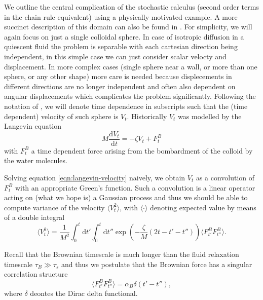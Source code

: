 \documentclass{doctoral}
\newcommand{\dd}{\mathrm{d}}
\begin{document}
We outline the central complication of the stochastic calculus (second order terms in the chain rule equivalent) using a physically motivated example.
A more succinct description of this domain can also be found in \textcite{Waszkiewicz_2023_pychastic}.
For simplicity, we will again focus on just a single colloidal sphere.
In case of isotropic diffusion in a quiescent fluid the problem is separable with each cartesian direction being independent, in this simple case we can just consider scalar velocty and displacement.
In more complex cases (single sphere near a wall, or more than one sphere, or any other shape) more care is needed because displecements in different directions are no longer independent and often also dependent on angular displacements which complicates the problem significantly.
Following the notation of \textcite{Ottinger_2012}, we will denote time dependence in subscripts such that the (time dependent) velocity of such sphere is $V_t$.
Historically $V_t$ was modelled by the Langevin equation
\begin{equation}
    M \frac{\dd V_t}{\dd t} = - \zeta V_t + F^{B}_t \label{eqn:langevin-velocity}
\end{equation}
with $F^B_t$ a time dependent force arising from the bombardment of the colloid by the water molecules.

Solving equation \eqref{eqn:langevin-velocity} naively, we obtain $V_t$ as a convolution of $F_t^B$ with an appropriate Green's function.
Such a convolution is a linear operator acting on (what we hope is) a Gaussian process and thus we should be able to compute variance of the velocity $\langle V_t^2 \rangle$, with $\langle \cdot \rangle$ denoting expected value by means of a double integral
\begin{equation}
    \langle V_t^2 \rangle = \frac{1}{M^2} \int_0^t \dd t' \int_0^t \dd t'' \exp\left( - \frac{\zeta}{M} (2t - t' - t'') \right) \langle F_{t'}^B F_{t''}^B \rangle.
    \label{eqn:velocity-variance-integral}
\end{equation}

Recall that the Brownian timescale is much longer than the fluid relaxation timescale $\tau_B \gg \tau_s$ and thus we postulate that the Brownian force has a singular correlation structure
\begin{equation}
    \langle F_{t'}^B F_{t''}^B \rangle = \alpha_B \delta(t'-t''), \label{eqn:white-noise-langevin}
\end{equation}
where $\delta$ deontes the Dirac delta functional.
\end{document}
